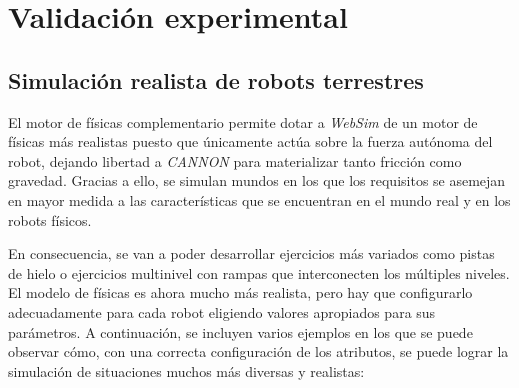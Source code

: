 \normalsize
\section{Validación experimental}
\subsection{Simulación realista de robots terrestres}
El motor de físicas complementario permite dotar a \textit{WebSim} de un motor de físicas más realistas puesto que únicamente actúa sobre la fuerza autónoma del robot, dejando libertad a \textit{CANNON} para materializar tanto fricción como gravedad. Gracias a ello, se simulan mundos en los que los requisitos se asemejan en mayor medida a las características que se encuentran en el mundo real y en los robots físicos. \newline

En consecuencia, se van a poder desarrollar ejercicios más variados como pistas de hielo o ejercicios multinivel con rampas que interconecten los múltiples niveles. El modelo de físicas es ahora mucho más realista, pero hay que configurarlo adecuadamente para
cada robot eligiendo valores apropiados para sus parámetros. A continuación, se incluyen varios ejemplos en los que se puede observar cómo, con una correcta configuración de los atributos, se puede lograr la simulación de situaciones muchos más diversas y realistas:

